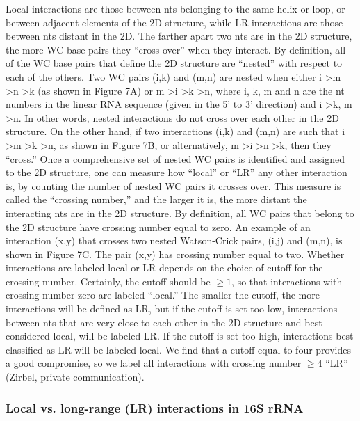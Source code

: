 Local interactions are those between nts belonging to the same helix or loop, or
between adjacent elements of the 2D structure, while LR interactions are those
between nts distant in the 2D. The farther apart two nts are in the 2D
structure, the more WC base pairs they ``cross over'' when they interact. By
definition, all of the WC base pairs that define the 2D structure are ``nested''
with respect to each of the others.  Two WC pairs (i,k) and (m,n) are nested
when either i \textgreater m \textgreater n \textgreater k (as shown in Figure
7A) or m \textgreater i \textgreater k \textgreater n, where i, k, m and n are
the nt numbers in the linear RNA sequence (given in the 5’ to 3’ direction) and
i \textgreater k, m \textgreater n. In other words, nested interactions do not
cross over each other in the 2D structure. On the other hand, if two
interactions (i,k) and (m,n) are such that i \textgreater m \textgreater k
\textgreater n, as shown in Figure 7B, or alternatively, m \textgreater i
\textgreater n \textgreater k, then they ``cross.'' Once a comprehensive set of
nested WC pairs is identified and assigned to the 2D structure, one can measure
how ``local'' or ``LR'' any other interaction is, by counting the number of nested
WC pairs it crosses over. This measure is called the “crossing number,” and the
larger it is, the more distant the interacting nts are in the 2D structure.  By
definition, all WC pairs that belong to the 2D structure have crossing number
equal to zero. An example of an interaction (x,y) that crosses two nested
Watson-Crick pairs, (i,j) and (m,n), is shown in Figure 7C. The pair (x,y) has
crossing number equal to two. Whether interactions are labeled local or LR
depends on the choice of cutoff for the crossing number. Certainly, the cutoff
should be $\ge 1$, so that interactions with crossing number zero are labeled
“local.” The smaller the cutoff, the more interactions will be defined as LR,
but if the cutoff is set too low, interactions between nts that are very close
to each other in the 2D structure and best considered local, will be labeled LR.
If the cutoff is set too high, interactions best classified as LR will be
labeled local. We find that a cutoff equal to four provides a good compromise,
so we label all interactions with crossing number $\ge 4$ ``LR'' (Zirbel, private
communication). 

\subsubsection{Local vs. long-range (LR) interactions in 16S rRNA}

